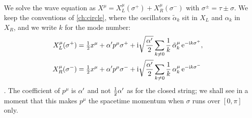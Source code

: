 We solve the wave equation as $X^\mu=X^\mu_L(\sigma^+)+X^\mu_R(\sigma^-)$ with
$\sigma^\pm=\tau\pm\sigma$. We keep the conventions of \cref{ch:circle}, where the oscillators
$\tilde\alpha_k$ sit in $X_L$ and $\alpha_k$ in $X_R$, and we write $k$ for the mode number:
\begin{align}
 X_L^\mu(\sigma^+)&=\tfrac12x^\mu+\alpha' p^\mu\sigma^+
   +\mathrm{i}\sqrt{\frac{\alpha'}2}\sum_{k\ne0}\frac1k\,\tilde\alpha^\mu_k\,\mathrm{e}^{-\mathrm{i} k\sigma^+},\notag\\
 X_R^\mu(\sigma^-)&=\tfrac12x^\mu+\alpha' p^\mu\sigma^-
   +\mathrm{i}\sqrt{\frac{\alpha'}2}\sum_{k\ne0}\frac1k\,\alpha^\mu_k\,\mathrm{e}^{-\mathrm{i} k\sigma^-}
 \label{eq:dbranes:LR}
\end{align}
. The coefficient of $p^\mu$ is $\alpha'$ and not
$\frac12\alpha'$ as for the closed string; we shall see in a moment that this makes $p^\mu$ the
spacetime momentum when $\sigma$ runs over $[0,\pi]$ only.

